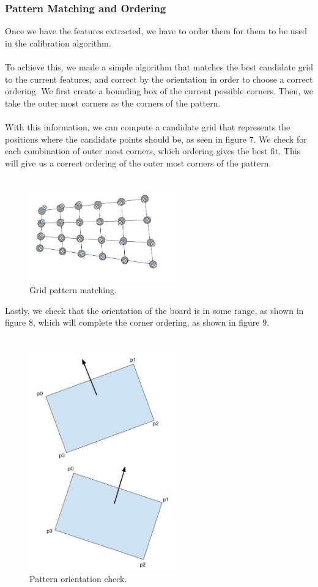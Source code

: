 \documentclass[journal]{IEEEtran}
\begin{document}
\subsubsection{ \textbf{ Pattern Matching and Ordering } }
Once we have the features extracted, we have to order them for them to be used in the calibration algorithm. 
\\
\\
To achieve this, we made a simple algorithm that matches the best candidate grid to the current features, and correct by the orientation in order to choose a correct ordering. We first create a bounding box of the current possible corners. Then, we take the outer most corners as the corners of the pattern. 
\\
\\
With this information, we can compute a candidate grid that represents the positions where the candidate points should be, as seen in figure 7. We check for each combination of outer most corners, which ordering gives the best fit. This will give us a correct ordering of the outer most corners of the pattern.
\\
\\
\begin{figure}[H]
\centering
\includegraphics[width=2.5in]{_img/img_report3_pattern_matching.jpg}
\caption{Grid pattern matching.}
\end{figure}
Lastly, we check that the orientation of the board is in some range, as shown in figure 8, which will complete the corner ordering, as shown in figure 9.
\\
\\
\begin{figure}[H]
\centering
\includegraphics[width=2.5in]{_img/img_pattern_orientation_checking.jpg}
\caption{Pattern orientation check.}
\end{figure}
\end{document}
